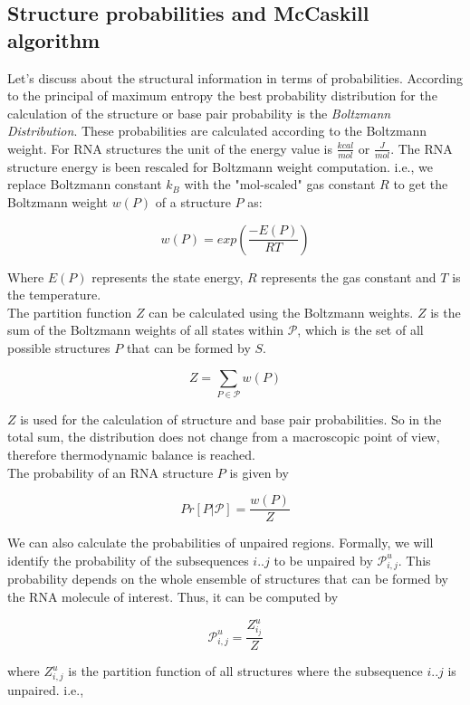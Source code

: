 \documentclass[twoside,a4paper]{report}
\begin{document}
 	 \subsection{Structure probabilities and McCaskill algorithm}
 	 Let's discuss about the structural information in terms of probabilities. According to the principal of maximum entropy \citep{jaynes1957information} the best probability distribution for the calculation of the structure or base pair probability is the \textit{Boltzmann Distribution}. These probabilities are calculated according to the Boltzmann weight. For RNA structures the unit of the energy value is $\frac{kcal}{mol}$ or $\frac{J}{mol}$. The RNA structure energy is been rescaled for Boltzmann weight computation. i.e., we replace Boltzmann constant $k_B$ with the "mol-scaled" gas constant $R$ to get the Boltzmann weight $w(P)$ of a structure $P$ as:\\
 	 
 	 \begin{center}	 
 	 \[ 
 	 w(P)= exp\left( \frac{-E(P)}{RT} \right)
 	 \]
 	 \end{center}
 	 
 	 Where $E(P)$ represents the state energy, $R $ represents the gas constant and $T$ is the temperature.\\
 	 The partition function $Z$ can be calculated using the Boltzmann weights. $Z$ is the sum of the Boltzmann weights of all states within $\mathcal{P}$, which is the set of all possible structures $P$ that can be formed by $S$. \\
 	 \begin{center}	 
 	 	\[ 
 	 	Z= \sum_{P \in \mathcal{P}} w(P)
 	 	\]
 	 \end{center}
 	 
 	 $Z$ is used for the calculation of structure and base pair probabilities. So in the total sum, the distribution does not change from a macroscopic point of view, therefore thermodynamic balance is reached.\\
 	 The probability of an RNA structure $P$ is given by \\  
 	  \begin{center}	 
 	 	\[ 
 	 Pr[P|\mathcal{P}] = \frac{w(P)}{Z} 
 	 	\]
 	 \end{center}

  	
  	 We can also calculate the probabilities of unpaired regions. Formally, we will identify the probability of the subsequences $i..j$ to be unpaired by $\mathcal{P}_{i,j}^{u}$. This probability depends on the whole ensemble of structures that can be formed by the RNA molecule of interest. Thus, it can be computed by\\
     \begin{center}	 
     	\[ 
     	\mathcal{P}_{i,j}^{u} = \frac{Z^u_{i_j}}{Z}
     	\]
     \end{center}
 	 where $Z^u_{i,j}$ is the partition function of all structures where the subsequence $i..j$ is unpaired. i.e.,\\
 	 
\end{document}
